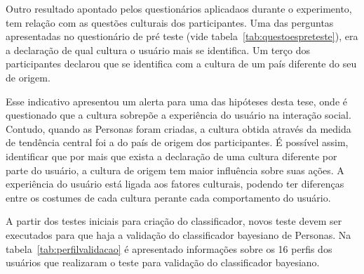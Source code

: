 Outro resultado apontado pelos questionários aplicadaos durante o experimento, tem relação com as questões culturais dos participantes. Uma das perguntas apresentadas no questionário de pré teste (vide tabela~\ref{tab:questoespreteste}), era a declaração de qual cultura o usuário mais se identifica. Um terço dos participantes declarou que se identifica com a cultura de um país diferente do seu de origem.

Esse indicativo apresentou um alerta para uma das hipóteses desta tese, onde é questionado que a cultura sobrepõe a experiência do usuário na interação social. Contudo, quando as Personas foram criadas, a cultura obtida através da medida de tendência central foi a do país de origem dos participantes. É possível assim, identificar que por mais que exista a declaração de uma cultura diferente por parte do usuário, a cultura de origem tem maior influência sobre suas ações. A experiência do usuário está ligada aos fatores culturais, podendo ter diferenças entre os costumes de cada cultura perante cada comportamento do usuário.

A partir dos testes iniciais para criação do classificador, novos teste devem ser executados para que haja a validação do classificador bayesiano de Personas. Na tabela~\ref{tab:perfilvalidacao} é apresentado informações sobre os 16 perfis dos usuários que realizaram o teste para validação do classificador bayesiano.

